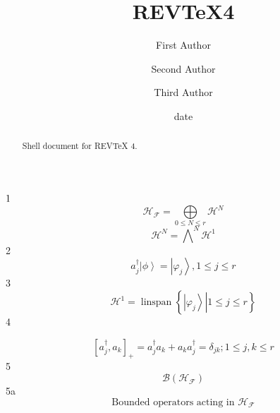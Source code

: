 \documentclass[aps,preprint]{revtex4}%
\begin{document}
\title[Short title for running header]{REV\TeX4}
\author{First Author}
\author{Second Author}
\author{Third Author}

\begin{abstract}
Shell document for REV\TeX{} 4.

\end{abstract}
\date[Date text]{date}




\maketitle
\tableofcontents


$\bigskip1$%
\[
\mathcal{H}_{\mathcal{F}}=%
{\displaystyle\bigoplus\limits_{0\leq N\leq r}}
\mathcal{H}^{N}%
\]%
\[
\mathcal{H}^{N}=%
{\displaystyle\bigwedge\nolimits^{N}}
\mathcal{H}^{1}%
\]
2%
\[
a_{j}^{\dagger}\left\vert \phi\right\rangle =\left\vert \varphi_{j}%
\right\rangle ,1\leq j\leq r
\]
$3$%
\[
\mathcal{H}^{1}=\operatorname*{linspan}\left\{  \left.  \left\vert \varphi
_{j}\right\rangle \right\vert 1\leq j\leq r\right\}
\]
4%

\[
\left[  a_{j}^{\dagger},a_{k}\right]  _{+}=a_{j}^{\dagger}a_{k}+a_{k}%
a_{j}^{\dagger}=\delta_{jk};1\leq j,k\leq r
\]
5%
\[
\mathcal{B}\left(  \mathcal{H}_{\mathcal{F}}\right)
\]
5a%
\[
\text{Bounded operators acting in }\mathcal{H}_{\mathcal{F}}%
\]
\end{document}
